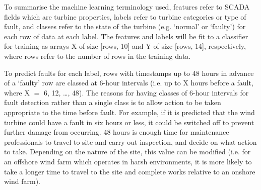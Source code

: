 To summarise the machine learning terminology used, features refer to SCADA fields which are turbine properties, labels refer to turbine categories or type of fault, and classes refer to the state of the turbine (e.g. `normal' or `faulty') for each row of data at each label. The features and labels will be fit to a classifier for training as arrays X of size [rows, 10] and Y of size [rows, 14], respectively, where rows refer to the number of rows in the training data.

To predict faults for each label, rows with timestamps up to 48 hours in advance of a `faulty' row are classed at 6-hour intervals (i.e. up to X hours before a fault, where X $=$ 6, 12, \dots, 48). The reasons for having classes of 6-hour intervals for fault detection rather than a single class is to allow action to be taken appropriate to the time before fault. For example, if it is predicted that the wind turbine could have a fault in six hours or less, it could be switched off to prevent further damage from occurring. 48 hours is enough time for maintenance professionals to travel to site and carry out inspection, and decide on what action to take. Depending on the nature of the site, this value can be modified (i.e. for an offshore wind farm which operates in harsh environments, it is more likely to take a longer time to travel to the site and complete works relative to an onshore wind farm).

